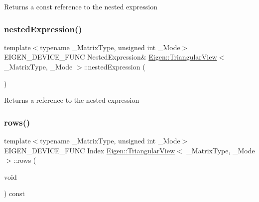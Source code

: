 \begin{DoxyReturn}{Returns}
a const reference to the nested expression 
\end{DoxyReturn}
\mbox{\label{class_eigen_1_1_triangular_view_a62e7446cc39a920b8b59eb02380abc4b}} 
\subsubsection{\texorpdfstring{nestedExpression()}{nestedExpression()}\hspace{0.1cm}{\footnotesize\ttfamily [2/2]}}
{\footnotesize\ttfamily template$<$typename \+\_\+\+Matrix\+Type, unsigned int \+\_\+\+Mode$>$ \\
E\+I\+G\+E\+N\+\_\+\+D\+E\+V\+I\+C\+E\+\_\+\+F\+U\+NC Nested\+Expression\& \mbox{\hyperlink{class_eigen_1_1_triangular_view}{Eigen\+::\+Triangular\+View}}$<$ \+\_\+\+Matrix\+Type, \+\_\+\+Mode $>$\+::nested\+Expression (\begin{DoxyParamCaption}{ }\end{DoxyParamCaption})\hspace{0.3cm}{\ttfamily [inline]}}

\begin{DoxyReturn}{Returns}
a reference to the nested expression 
\end{DoxyReturn}
\mbox{\label{class_eigen_1_1_triangular_view_a34de9aa9961062ff65f24bbeaef4e693}} 
\subsubsection{\texorpdfstring{rows()}{rows()}}
{\footnotesize\ttfamily template$<$typename \+\_\+\+Matrix\+Type, unsigned int \+\_\+\+Mode$>$ \\
E\+I\+G\+E\+N\+\_\+\+D\+E\+V\+I\+C\+E\+\_\+\+F\+U\+NC Index \mbox{\hyperlink{class_eigen_1_1_triangular_view}{Eigen\+::\+Triangular\+View}}$<$ \+\_\+\+Matrix\+Type, \+\_\+\+Mode $>$\+::rows (\begin{DoxyParamCaption}\item[{void}]{ }\end{DoxyParamCaption}) const\hspace{0.3cm}{\ttfamily [inline]}}





